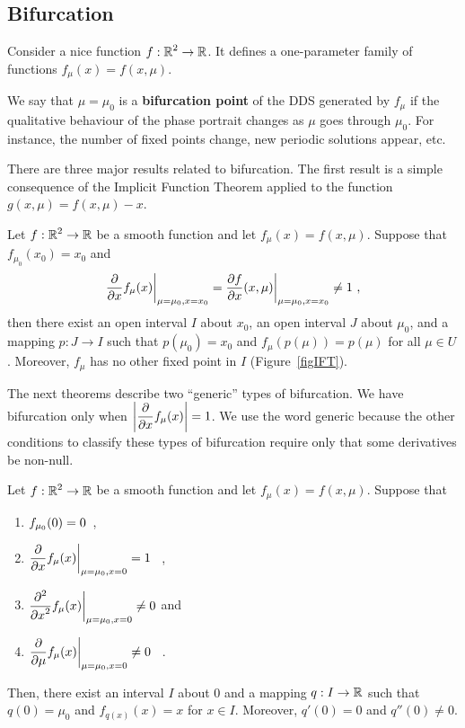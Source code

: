 \subsection{Bifurcation}

Consider a nice function $\DS f:\RR^2 \rightarrow \RR$.  It defines a
one-parameter family of functions $f_\mu(x) = f(x,\mu)$.

We say that $\mu = \mu_0$ is a
{\bfseries bifurcation point} of the
DDS generated by $f_\mu$ if the qualitative behaviour of the phase
portrait changes as $\mu$ goes through $\mu_0$.  For instance, the
number of fixed points change, new periodic solutions appear, etc.

There are three major results related to bifurcation.  The first
result is a simple consequence of the Implicit Function Theorem
applied to the function $g(x,\mu) = f(x,\mu) - x$.

\begin{theorem} \label{IFTforDS}
Let $\DS f:\RR^2 \rightarrow \RR$ be a smooth function and let
$f_\mu(x)= f(x,\mu)$.  Suppose that $f_{\mu_0}(x_0) = x_0$ and
\[
\pdfdx{f_{\mu}(x)}{x} \bigg|_{\mu=\mu_0,x=x_0}
= \pdydx{f}{x}(x,\mu) \bigg|_{\mu=\mu_0,x=x_0} \neq 1  \ ,
\]
then there exist an open interval $I$ about $x_0$, an open interval
$J$ about $\mu_0$, and a mapping $p:J\rightarrow I$ such that
$p(\mu_0)=x_0$ and $f_\mu(p(\mu))=p(\mu)$ for all $\mu \in U$.
Moreover, $f_\mu$ has no other fixed point in $I$ (Figure~\ref{figIFT}).
\end{theorem}


The next theorems describe two ``generic'' types of bifurcation.  We
have bifurcation only when
$\DS \left| \pdfdx{f_{\mu}(x)}{x}\right| = 1$.  We use the
word generic because the other conditions to classify these types of
bifurcation require only that some derivatives be non-null.

\begin{theorem}
Let $\DS f:\RR^2 \rightarrow \RR$ be a smooth function and let
$f_\mu(x)= f(x,\mu)$.  Suppose that
\begin{enumerate}
\item $\DS f_{\mu_0}(0)=0$\ ,
\item $\DS \pdfdx{f_{\mu}(x)}{x}\bigg|_{\mu=\mu_0,x=0} = 1$ \ ,
\item $\DS \pdfdxn{f_{\mu}(x)}{x}{2}\bigg|_{\mu=\mu_0,x=0} \neq 0$
\quad and
\item $\DS \pdfdx{f_\mu(x)}{\mu}\bigg|_{\mu=\mu_0,x=0} \neq 0$ \ .
\end{enumerate}
Then, there exist an interval $I$ about $0$ and a mapping
$q:I\rightarrow \RR$ such that $q(0) = \mu_0$ and $f_{q(x)}(x) = x$
for $x \in I$.  Moreover, $q'(0) = 0$ and $q''(0) \neq 0$.
\end{theorem}

